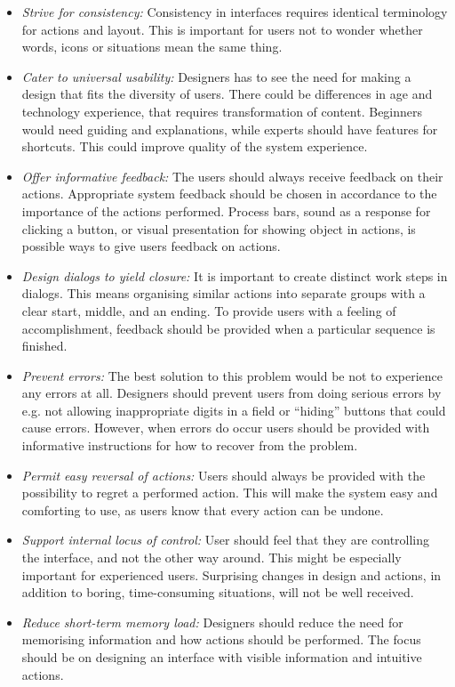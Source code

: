 \begin{itemize} 
\item \emph{Strive for consistency:} Consistency in interfaces requires identical terminology for actions and layout. This is important for users not to wonder whether words, icons or situations mean the same thing. 
\item \emph{Cater to universal usability:} Designers has to see the need for making a design that fits the diversity of users. There could be differences in age and technology experience, that requires transformation of content. Beginners would need guiding and explanations, while experts should have features for shortcuts. This could improve quality of the system experience. 
\item \emph{Offer informative feedback:} The users should always receive feedback on their actions. Appropriate system feedback should be chosen in accordance to the importance of the actions performed. Process bars, sound as a response for clicking a button, or visual presentation for showing object in actions, is possible ways to give users feedback on actions.  
\item \emph{Design dialogs to yield closure:} It is important to create distinct work steps in dialogs. This means organising similar actions into separate groups with a clear start, middle, and an ending. To provide users with a feeling of accomplishment, feedback should be provided when a particular sequence is finished.     
\item \emph{Prevent errors:} The best solution to this problem would be not to experience any errors at all. Designers should prevent users from doing serious errors by e.g. not allowing inappropriate digits in a field or “hiding” buttons that could cause errors. However, when errors do occur users should be provided with informative instructions for how to recover from the problem.   
\item \emph{Permit easy reversal of actions:} Users should always be provided with the possibility to regret a performed action. This will make the system easy and comforting to use, as users know that every action can be undone. 
\item \emph{Support internal locus of control:} User should feel that they are controlling the interface, and not the other way around. This might be especially important for experienced users. Surprising changes in design and actions, in addition to boring, time-consuming situations, will not be well received. 
\item \emph{Reduce short-term memory load:} Designers should reduce the need for memorising information and how actions should be performed. The focus should be on designing an interface with visible information and intuitive actions.
\end{itemize}

